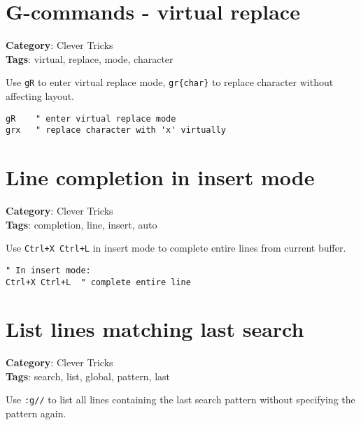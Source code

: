 {{\section{G-commands - virtual replace}

\textbf{Category}: Clever Tricks\\ \textbf{Tags}: virtual, replace, mode, character
\vspace{0.5cm}

Use {\footnotesize \Verb§gR§} to enter virtual replace mode, {\footnotesize \Verb§gr{char}§} to replace character without affecting layout.

\begin{Exa*}{}
\begin{Verbatim}[fontsize=\footnotesize, breaklines, breakanywhere]
gR    " enter virtual replace mode
grx   " replace character with 'x' virtually
\end{Verbatim}
\end{Exa*}

\section{Line completion in insert mode}

\textbf{Category}: Clever Tricks\\ \textbf{Tags}: completion, line, insert, auto
\vspace{0.5cm}

Use {\footnotesize \Verb§Ctrl+X Ctrl+L§} in insert mode to complete entire lines from current buffer.

\begin{Exa*}{}
\begin{Verbatim}[fontsize=\footnotesize, breaklines, breakanywhere]
" In insert mode:
Ctrl+X Ctrl+L  " complete entire line
\end{Verbatim}
\end{Exa*}

\section{List lines matching last search}

\textbf{Category}: Clever Tricks\\ \textbf{Tags}: search, list, global, pattern, last
\vspace{0.5cm}

Use {\footnotesize \Verb§:g//§} to list all lines containing the last search pattern without specifying the pattern again.

}}
